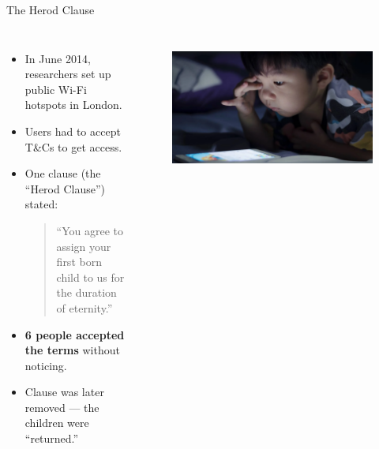 \begin{frame}{The Herod Clause}
\begin{columns}[c]
  \begin{itemize}
    \item In June 2014, researchers set up public Wi-Fi hotspots in London.
    \item Users had to accept T\&Cs to get access.
    \item One clause (the “Herod Clause”) stated:
    \begin{quote}
        “You agree to assign your first born child to us for the duration of eternity.”
    \end{quote}
    \item \textbf{6 people accepted the terms} without noticing.
    \item Clause was later removed — the children were “returned.”
\end{itemize}

    \centering
    \begin{figure}
        \centering
        \includegraphics[width=\textwidth]{images/child.png}
        \label{fig:child}
    \end{figure}    
\end{columns}
\end{frame}

